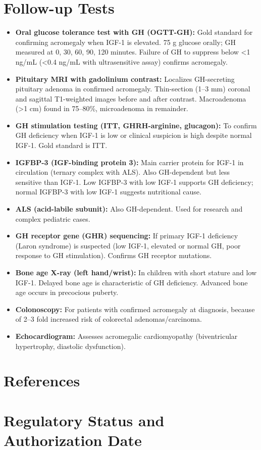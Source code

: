 \section*{Follow-up Tests}
\begin{itemize}
  \item \textbf{Oral glucose tolerance test with GH (OGTT-GH):} Gold standard for confirming acromegaly when IGF-1 is elevated. 75 g glucose orally; GH measured at 0, 30, 60, 90, 120 minutes. Failure of GH to suppress below <1 ng/mL (<0.4 ng/mL with ultrasensitive assay) confirms acromegaly.
  \item \textbf{Pituitary MRI with gadolinium contrast:} Localizes GH-secreting pituitary adenoma in confirmed acromegaly. Thin-section (1--3 mm) coronal and sagittal T1-weighted images before and after contrast. Macroadenoma (>1 cm) found in 75--80\%, microadenoma in remainder.
  \item \textbf{GH stimulation testing (ITT, GHRH-arginine, glucagon):} To confirm GH deficiency when IGF-1 is low or clinical suspicion is high despite normal IGF-1. Gold standard is ITT.
  \item \textbf{IGFBP-3 (IGF-binding protein 3):} Main carrier protein for IGF-1 in circulation (ternary complex with ALS). Also GH-dependent but less sensitive than IGF-1. Low IGFBP-3 with low IGF-1 supports GH deficiency; normal IGFBP-3 with low IGF-1 suggests nutritional cause.
  \item \textbf{ALS (acid-labile subunit):} Also GH-dependent. Used for research and complex pediatric cases.
  \item \textbf{GH receptor gene (GHR) sequencing:} If primary IGF-1 deficiency (Laron syndrome) is suspected (low IGF-1, elevated or normal GH, poor response to GH stimulation). Confirms GH receptor mutations.
  \item \textbf{Bone age X-ray (left hand/wrist):} In children with short stature and low IGF-1. Delayed bone age is characteristic of GH deficiency. Advanced bone age occurs in precocious puberty.
  \item \textbf{Colonoscopy:} For patients with confirmed acromegaly at diagnosis, because of 2--3 fold increased risk of colorectal adenomas/carcinoma.
  \item \textbf{Echocardiogram:} Assesses acromegalic cardiomyopathy (biventricular hypertrophy, diastolic dysfunction).
\end{itemize}

\section*{References}



\clearpage
\section*{Regulatory Status and Authorization Date}

\clearpage
